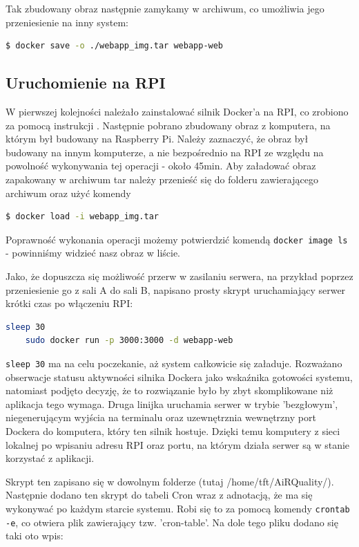 Tak zbudowany obraz następnie zamykamy w archiwum, co umożliwia jego przeniesienie na inny system:

\begin{lstlisting}[language=bash]
    $ docker save -o ./webapp_img.tar webapp-web
\end{lstlisting}

\subsection{Uruchomienie na RPI}
W pierwszej kolejności należało zainstalować silnik Docker'a na RPI, co zrobiono za pomocą instrukcji \cite{dockerRPI}. Następnie pobrano zbudowany obraz z komputera,
na którym był budowany na Raspberry Pi. Należy zaznaczyć, że obraz był budowany na innym komputerze, a nie bezpośrednio na RPI ze względu na powolność wykonywania
tej operacji - około 45min.
Aby załadować obraz zapakowany w archiwum tar należy przenieść się do folderu zawierającego archiwum oraz użyć komendy

\begin{lstlisting}[language=bash]
    $ docker load -i webapp_img.tar
\end{lstlisting}

Poprawność wykonania operacji możemy potwierdzić komendą \lstinline|docker image ls| - powinniśmy widzieć nasz obraz w liście.

Jako, że dopuszcza się możliwość przerw w zasilaniu serwera, na przykład poprzez przeniesienie go z sali A do sali B, napisano prosty
skrypt uruchamiający serwer krótki czas po włączeniu RPI:

\begin{lstlisting}[language=bash]
    sleep 30
    sudo docker run -p 3000:3000 -d webapp-web
\end{lstlisting}

\lstinline|sleep 30| ma na celu poczekanie, aż system całkowicie się załaduje. Rozważano obserwacje statusu aktywności silnika Dockera 
jako wskaźnika gotowości systemu, natomiast podjęto decyzję, że to rozwiązanie było by zbyt skomplikowane niż aplikacja tego wymaga.
Druga linijka uruchamia serwer w trybie 'bezgłowym', niegenerującym wyjścia na terminalu oraz uzewnętrznia wewnętrzny port Dockera
do komputera, który ten silnik hostuje. Dzięki temu komputery z sieci lokalnej po wpisaniu adresu RPI oraz portu, na którym działa serwer są 
w stanie korzystać z aplikacji.
 
Skrypt ten zapisano się w dowolnym folderze (tutaj /home/tft/AiRQuality/). Następnie dodano ten skrypt do tabeli Cron wraz z adnotacją, że
ma się wykonywać po każdym starcie systemu. Robi się to za pomocą komendy \lstinline|crontab -e|, co otwiera plik zawierający tzw. 'cron-table'.
Na dole tego pliku dodano się taki oto wpis:

